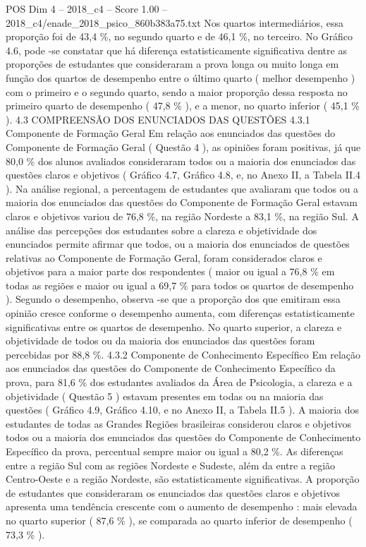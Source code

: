 \begin{textsample}{POS Dim 4 – 2018\_c4 – Score 1.00 – 2018\_c4/enade\_2018\_psico\_860b383a75.txt}
Nos quartos intermediários, essa proporção foi de 43,4 \%, no segundo quarto e de 46,1 \%, no terceiro.
No Gráfico 4.6, pode -se constatar que há diferença estatisticamente significativa dentre as proporções de estudantes que consideraram a prova longa ou muito longa em função dos quartos de desempenho entre o último quarto ( melhor desempenho ) com o primeiro e o segundo quarto, sendo a maior proporção dessa resposta no primeiro quarto de desempenho ( 47,8 \% ), e a menor, no quarto inferior ( 45,1 \% ). 4.3 COMPREENSÃO DOS ENUNCIADOS DAS QUESTÕES 4.3.1 Componente de Formação Geral Em relação aos enunciados das questões do Componente de Formação Geral ( Questão 4 ), as opiniões foram positivas, já que 80,0 \% dos alunos avaliados consideraram todos ou a maioria dos enunciados das questões claros e objetivos ( Gráfico 4.7, Gráfico 4.8, e, no Anexo II, a Tabela II.4 ).
Na análise regional, a percentagem de estudantes que avaliaram que todos ou a maioria dos enunciados das questões do Componente de Formação Geral estavam claros e objetivos variou de 76,8 \%, na região Nordeste a 83,1 \%, na região Sul.
A análise das percepções dos estudantes sobre a clareza e objetividade dos enunciados permite afirmar que todos, ou a maioria dos enunciados de questões relativas ao Componente de Formação Geral, foram considerados claros e objetivos para a maior parte dos respondentes ( maior ou igual a 76,8 \% em todas as regiões e maior ou igual a 69,7 \% para todos os quartos de desempenho ).
Segundo o desempenho, observa -se que a proporção dos que emitiram essa opinião cresce conforme o desempenho aumenta, com diferenças estatisticamente significativas entre os quartos de desempenho.
No quarto superior, a clareza e objetividade de todos ou da maioria dos enunciados das questões foram percebidas por 88,8 \%. 4.3.2 Componente de Conhecimento Específico Em relação aos enunciados das questões do Componente de Conhecimento Específico da prova, para 81,6 \% dos estudantes avaliados da Área de Psicologia, a clareza e a objetividade ( Questão 5 ) estavam presentes em todas ou na maioria das questões ( Gráfico 4.9, Gráfico 4.10, e no Anexo II, a Tabela II.5 ).
A maioria dos estudantes de todas as Grandes Regiões brasileiras considerou claros e objetivos todos ou a maioria dos enunciados das questões do Componente de Conhecimento Específico da prova, percentual sempre maior ou igual a 80,2 \%.
As diferenças entre a região Sul com as regiões Nordeste e Sudeste, além da entre a região Centro-Oeste e a região Nordeste, são estatisticamente significativas.
A proporção de estudantes que consideraram os enunciados das questões claros e objetivos apresenta uma tendência crescente com o aumento de desempenho : mais elevada no quarto superior ( 87,6 \% ), se comparada ao quarto inferior de desempenho ( 73,3 \% ).

\end{textsample}
